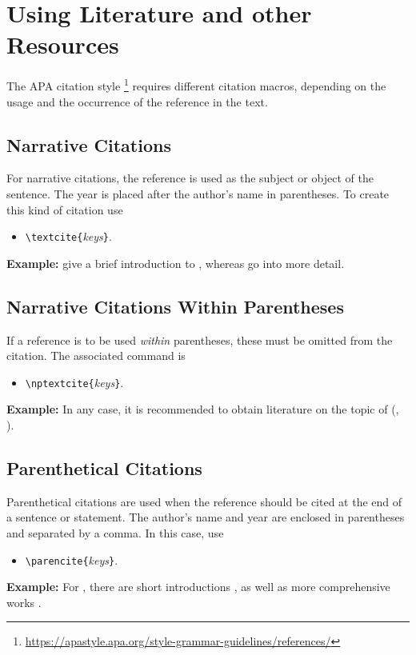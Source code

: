\chapter[Using Literature]{Using Literature and other Resources}
\label{cha:Literature}

The APA citation style%
\footnote{\url{https://apastyle.apa.org/style-grammar-guidelines/references/}}
requires different citation macros, depending on the usage and the
occurrence of the reference in the text.

\section{Narrative Citations}

For narrative citations, the reference is used as the subject or object of the
sentence. The year is placed after the author's name in parentheses. To create
this kind of citation use 
%
\begin{itemize}
\item[] \verb!\textcite{!\textit{keys}\verb!}!.
\end{itemize}
%
\textbf{Example:}
\textcite{Daniel2018} give a brief introduction to \latex, whereas \textcite{Oetiker2021, Kopka2003} 
go into more detail.


\section{Narrative Citations Within Parentheses}

If a reference is to be used \emph{within} parentheses, these must be omitted
from the citation. The associated command is
%
\begin{itemize}
\item[] \verb!\nptextcite{!\textit{keys}\verb!}!.
\end{itemize}
%
\textbf{Example:}
In any case, it is recommended to obtain literature on the topic of \latex (\eg, 
).


\section{Parenthetical Citations}

Parenthetical citations are used when the reference should be cited at the end
of a sentence or statement. The author's name and year are enclosed in
parentheses and separated by a comma. In this case, use
%
\begin{itemize}
\item[] \verb!\parencite{!\textit{keys}\verb!}!.
\end{itemize}
%
\textbf{Example:}
For \latex, there are short introductions \parencite{Daniel2018}, as well as
more comprehensive works \parencite{Oetiker2021, Kopka2003}.



